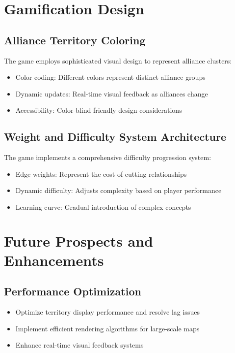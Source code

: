 \documentclass[english]{tudscrreprt}
\begin{document}
\section{Gamification Design}

\subsection{Alliance Territory Coloring}
The game employs sophisticated visual design to represent alliance clusters:

\begin{itemize}
  \item Color coding: Different colors represent distinct alliance groups
  \item Dynamic updates: Real-time visual feedback as alliances change
  \item Accessibility: Color-blind friendly design considerations
\end{itemize}

\subsection{Weight and Difficulty System Architecture}
The game implements a comprehensive difficulty progression system:

\begin{itemize}
  \item Edge weights: Represent the cost of cutting relationships
  \item Dynamic difficulty: Adjusts complexity based on player performance
  \item Learning curve: Gradual introduction of complex concepts
\end{itemize}

\section{Future Prospects and Enhancements}

\subsection{Performance Optimization}
\begin{itemize}
  \item Optimize territory display performance and resolve lag issues
  \item Implement efficient rendering algorithms for large-scale maps
  \item Enhance real-time visual feedback systems
\end{itemize}
\end{document}
